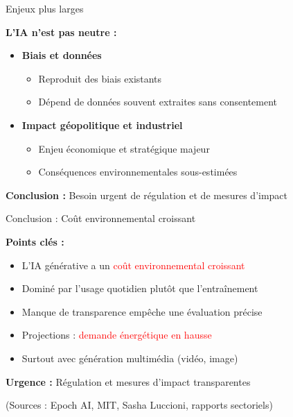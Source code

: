 \begin{frame}{Enjeux plus larges}

\textbf{L'IA n'est pas neutre :}

\vspace{0.3cm}

\begin{itemize}
    \item<+-> \textbf{Biais et données}
        \begin{itemize}
            \item Reproduit des biais existants
            \item Dépend de données souvent extraites sans consentement
        \end{itemize}

    \vspace{0.2cm}
    \item<+-> \textbf{Impact géopolitique et industriel}
        \begin{itemize}
            \item Enjeu économique et stratégique majeur
            \item Conséquences environnementales sous-estimées
        \end{itemize}
\end{itemize}

\vspace{0.5cm}
\textbf{Conclusion :} Besoin urgent de régulation et de mesures d'impact

\end{frame}

\begin{frame}{Conclusion : Coût environnemental croissant}

\textbf{Points clés :}

\vspace{0.3cm}

\begin{itemize}
    \item L'IA générative a un \textcolor{red}{coût environnemental croissant}
    \item Dominé par l'usage quotidien plutôt que l'entraînement
    \item Manque de transparence empêche une évaluation précise
    \item Projections : \textcolor{red}{demande énergétique en hausse}
    \item Surtout avec génération multimédia (vidéo, image)
\end{itemize}

\vspace{0.5cm}

\textbf{Urgence :} Régulation et mesures d'impact transparentes

\vspace{0.3cm}

\small{(Sources : Epoch AI, MIT, Sasha Luccioni, rapports sectoriels)}

\end{frame}

